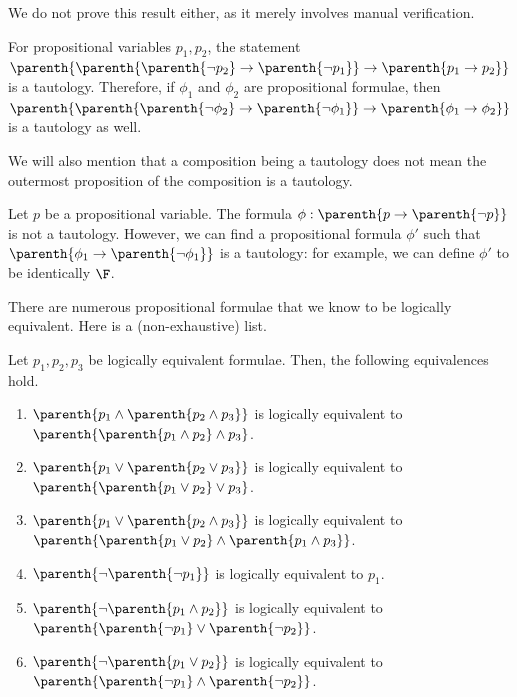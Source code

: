 We do not prove this result either, as it merely involves manual verification.

\begin{boxexample}
    For propositional variables $p_1, p_2$, the statement $\parenth{\parenth{\parenth{\neg p_2} \to \parenth{\neg p_1}} \to \parenth{p_1 \to p_2}}$ is a tautology. Therefore, if $\phi_1$ and $\phi_2$ are propositional formulae, then $\parenth{\parenth{\parenth{\neg \phi_2} \to \parenth{\neg \phi_1}} \to \parenth{\phi_1 \to \phi_2}}$ is a tautology as well.
\end{boxexample}

We will also mention that a composition being a tautology does not mean the outermost proposition of the composition is a tautology.

\begin{boxnexample}
    Let $p$ be a propositional variable. The formula $\phi : \parenth{p \to \parenth{\neg p}}$ is not a tautology. However, we can find a propositional formula $\phi'$ such that $\parenth{\phi_1 \to \parenth{\neg \phi_1}}$ is a tautology: for example, we can define $\phi'$ to be identically $\F$.
\end{boxnexample}

There are numerous propositional formulae that we know to be logically equivalent. Here is a (non-exhaustive) list.

\begin{boxexample}
    Let $p_1, p_2, p_3$ be logically equivalent formulae. Then, the following equivalences hold.
    \begin{enumerate}[noitemsep]
        \item $\parenth{p_1 \land \parenth{p_2 \land p_3}}$ is logically equivalent to $\parenth{\parenth{p_1 \land p_2} \land p_3}$.
        
        \item $\parenth{p_1 \lor \parenth{p_2 \lor p_3}}$ is logically equivalent to $\parenth{\parenth{p_1 \lor p_2} \lor p_3}$.

        \item $\parenth{p_1 \lor \parenth{p_2 \land p_3}}$ is logically equivalent to $\parenth{\parenth{p_1 \lor p_2} \land \parenth{p_1 \land p_3}}$.

        \item $\parenth{\neg \parenth{\neg p_1}}$ is logically equivalent to $p_1$.

        \item $\parenth{\neg \parenth{p_1 \land p_2}}$ is logically equivalent to $\parenth{\parenth{\neg p_1} \lor \parenth{\neg p_2}}$.

        \item $\parenth{\neg \parenth{p_1 \lor p_2}}$ is logically equivalent to $\parenth{\parenth{\neg p_1} \land \parenth{\neg p_2}}$.
    \end{enumerate}
\end{boxexample}

